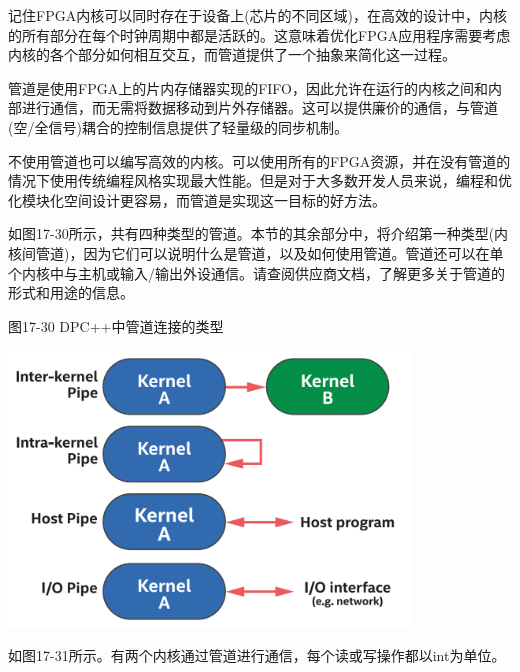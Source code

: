 记住FPGA内核可以同时存在于设备上(芯片的不同区域)，在高效的设计中，内核的所有部分在每个时钟周期中都是活跃的。这意味着优化FPGA应用程序需要考虑内核的各个部分如何相互交互，而管道提供了一个抽象来简化这一过程。\par

管道是使用FPGA上的片内存储器实现的FIFO，因此允许在运行的内核之间和内部进行通信，而无需将数据移动到片外存储器。这可以提供廉价的通信，与管道(空/全信号)耦合的控制信息提供了轻量级的同步机制。\par

\begin{tcolorbox}[colback=blue!5!white,colframe=blue!75!black, title=我们需要管道吗?]
不使用管道也可以编写高效的内核。可以使用所有的FPGA资源，并在没有管道的情况下使用传统编程风格实现最大性能。但是对于大多数开发人员来说，编程和优化模块化空间设计更容易，而管道是实现这一目标的好方法。
\end{tcolorbox}

如图17-30所示，共有四种类型的管道。本节的其余部分中，将介绍第一种类型(内核间管道)，因为它们可以说明什么是管道，以及如何使用管道。管道还可以在单个内核中与主机或输入/输出外设通信。请查阅供应商文档，了解更多关于管道的形式和用途的信息。\par

\hspace*{\fill} \par %
图17-30 DPC++中管道连接的类型
\begin{center}
	\includegraphics[width=0.8\textwidth]{content/chapter-17/images/25}
\end{center}

如图17-31所示。有两个内核通过管道进行通信，每个读或写操作都以int为单位。\par

